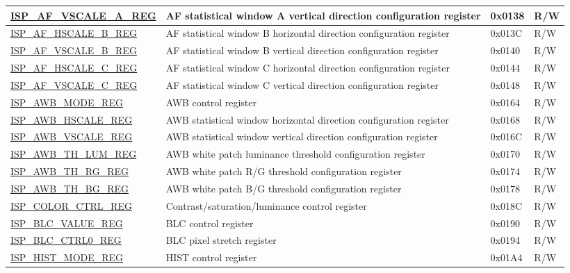 \begin{longtable}{ | p{6cm} | p{7.2cm} | p{1.3cm} | p{1cm} | }
\hyperref[regdesc:ISPAFVSCALEAREG]{ISP\_AF\_VSCALE\_A\_REG} & AF statistical window A vertical direction configuration register & 0x0138 & R/W \\ \hline
\hyperref[regdesc:ISPAFHSCALEBREG]{ISP\_AF\_HSCALE\_B\_REG} & AF statistical window B horizontal direction configuration register & 0x013C & R/W \\ \hline
\hyperref[regdesc:ISPAFVSCALEBREG]{ISP\_AF\_VSCALE\_B\_REG} & AF statistical window B vertical direction configuration register & 0x0140 & R/W \\ \hline
\hyperref[regdesc:ISPAFHSCALECREG]{ISP\_AF\_HSCALE\_C\_REG} & AF statistical window C horizontal direction configuration register & 0x0144 & R/W \\ \hline
\hyperref[regdesc:ISPAFVSCALECREG]{ISP\_AF\_VSCALE\_C\_REG} & AF statistical window C vertical direction configuration register & 0x0148 & R/W \\ \hline
\hyperref[regdesc:ISPAWBMODEREG]{ISP\_AWB\_MODE\_REG} & AWB control register & 0x0164 & R/W \\ \hline
\hyperref[regdesc:ISPAWBHSCALEREG]{ISP\_AWB\_HSCALE\_REG} & AWB statistical window horizontal direction configuration register & 0x0168 & R/W \\ \hline
\hyperref[regdesc:ISPAWBVSCALEREG]{ISP\_AWB\_VSCALE\_REG} & AWB statistical window vertical direction configuration register & 0x016C & R/W \\ \hline
\hyperref[regdesc:ISPAWBTHLUMREG]{ISP\_AWB\_TH\_LUM\_REG} & AWB white patch luminance threshold configuration register & 0x0170 & R/W \\ \hline
\hyperref[regdesc:ISPAWBTHRGREG]{ISP\_AWB\_TH\_RG\_REG} & AWB white patch R/G threshold configuration register & 0x0174 & R/W \\ \hline
\hyperref[regdesc:ISPAWBTHBGREG]{ISP\_AWB\_TH\_BG\_REG} & AWB white patch B/G threshold configuration register & 0x0178 & R/W \\ \hline
\hyperref[regdesc:ISPCOLORCTRLREG]{ISP\_COLOR\_CTRL\_REG} & Contrast/saturation/luminance control register & 0x018C & R/W \\ \hline
\hyperref[regdesc:ISPBLCVALUEREG]{ISP\_BLC\_VALUE\_REG} & BLC control register & 0x0190 & R/W \\ \hline
\hyperref[regdesc:ISPBLCCTRL0REG]{ISP\_BLC\_CTRL0\_REG} & BLC pixel stretch register & 0x0194 & R/W \\ \hline
\hyperref[regdesc:ISPHISTMODEREG]{ISP\_HIST\_MODE\_REG} & HIST control register & 0x01A4 & R/W \\ \hline

\end{longtable}
